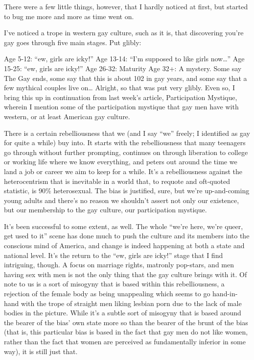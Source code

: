There were a few little things, however, that I hardly noticed at first, but started to bug me more and more as time went on.

I’ve noticed a trope in western gay culture, such as it is, that discovering you’re gay goes through five main stages.  Put glibly:

Age 5-12: ``ew, girls are icky!''
Age 13-14: ``I’m supposed to like girls now…''
Age 15-25: ``ew, girls are icky!''
Age 26-32: Maturity
Age 32+: A mystery.  Some say The Gay ends, some say that this is about 102 in gay years, and some say that a few mythical couples live on…
Alright, so that was put very glibly.  Even so, I bring this up in continuation from last week’s article, Participation Mystique, wherein I mention some of the participation mystique that gay men have with western, or at least American gay culture.

There is a certain rebelliousness that we (and I say ``we'' freely; I identified as gay for quite a while) buy into.  It starts with the rebelliousness that many teenagers go through without further prompting, continues on through liberation to college or working life where we know everything, and peters out around the time we land a job or career we aim to keep for a while. It’s a rebelliousness against the heterocentrism that is inevitable in a world that, to requote and oft-quoted statistic, is 90\% heterosexual.  The bias is justified, sure, but we’re up-and-coming young adults and there’s no reason we shouldn’t assert not only our existence, but our membership to the gay culture, our participation mystique.

It’s been successful to some extent, as well.  The whole ``we’re here, we’re queer, get used to it'' scene has done much to push the culture and its members into the conscious mind of America, and change is indeed happening at both a state and national level. It’s the return to the ``ew, girls are icky!'' stage that I find intriguing, though.  A focus on marriage rights, matronly pop-stars, and men having sex with men is not the only thing that the gay culture brings with it.  Of note to us is a sort of misogyny that is based within this rebelliousness, a rejection of the female body as being unappealing which seems to go hand-in-hand with the trope of straight men liking lesbian porn due to the lack of male bodies in the picture.  While it’s a subtle sort of misogyny that is based around the bearer of the bias’ own state more so than the bearer of the brunt of the bias (that is, this particular bias is based in the fact that gay men do not like women, rather than the fact that women are perceived as fundamentally inferior in some way), it is still just that.

